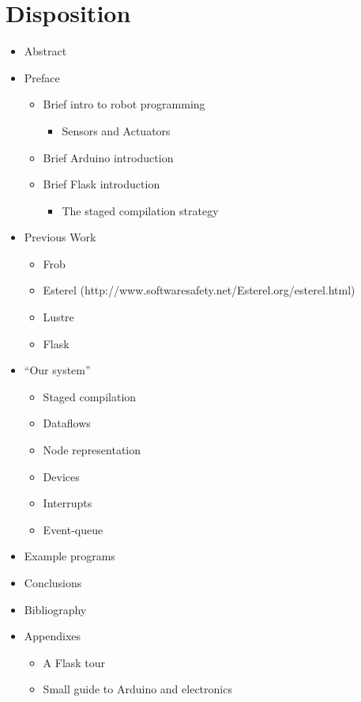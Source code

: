 \documentclass[a4paper,oneside, draft]{memoir}
\begin{document}
\section{Disposition}
\begin{itemize}
\item Abstract

\item Preface
  \begin{itemize}
  \item Brief intro to robot programming
    \begin{itemize}
     \item Sensors and Actuators
    \end{itemize}
  \item Brief Arduino introduction
  \item Brief Flask introduction
    \begin{itemize}
     \item The staged compilation strategy
    \end{itemize}
  \end{itemize}

\item Previous Work
  \begin{itemize}
  \item Frob
  \item Esterel
    (http://www.softwaresafety.net/Esterel.org/esterel.html)
  \item Lustre \cite{lustre91}
  \item Flask
  \end{itemize}

\item "`Our system"'
  \begin{itemize}
  \item Staged compilation
  \item Dataflows
  \item Node representation
  \item Devices
  \item Interrupts
  \item Event-queue
  \end{itemize}

\item Example programs

\item Conclusions

\item Bibliography

\item Appendixes
  \begin{itemize}
  \item A Flask tour
  \item Small guide to Arduino and electronics
  \end{itemize}
\end{itemize}  
\end{document}
